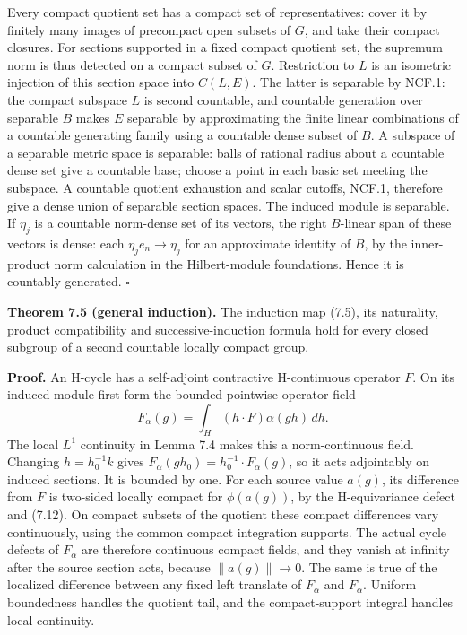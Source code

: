 \documentclass[
  11pt,
]{article}
\begin{document}
Every compact quotient set has a compact set of representatives: cover
it by finitely many images of precompact open subsets of \(G\), and take
their compact closures. For sections supported in a fixed compact
quotient set, the supremum norm is thus detected on a compact subset of
\(G\). Restriction to \(L\) is an isometric injection of this section
space into \(C(L,E)\). The latter is separable by NCF.1: the compact
subspace \(L\) is second countable, and countable generation over
separable \(B\) makes \(E\) separable by approximating the finite linear
combinations of a countable generating family using a countable dense
subset of \(B\). A subspace of a separable metric space is separable:
balls of rational radius about a countable dense set give a countable
base; choose a point in each basic set meeting the subspace. A countable
quotient exhaustion and scalar cutoffs, NCF.1, therefore give a dense
union of separable section spaces. The induced module is separable. If
\(\eta_j\) is a countable norm-dense set of its vectors, the right
\(B\)-linear span of these vectors is dense: each
\(\eta_j e_n\to\eta_j\) for an approximate identity of \(B\), by the
inner-product norm calculation in the Hilbert-module foundations. Hence
it is countably generated. \(\square\)

\textbf{Theorem 7.5 (general induction).} The induction map (7.5), its
naturality, product compatibility and successive-induction formula hold
for every closed subgroup of a second countable locally compact group.

\textbf{Proof.} An H-cycle has a self-adjoint contractive H-continuous
operator \(F\). On its induced module first form the bounded pointwise
operator field \[
F_\alpha(g)=\int_H(h\cdot F)\alpha(gh)\,dh.
\tag{7.14}
\] The local \(L^1\) continuity in Lemma 7.4 makes this a
norm-continuous field. Changing \(h=h_0^{-1}k\) gives
\(F_\alpha(gh_0)=h_0^{-1}\cdot F_\alpha(g)\), so it acts adjointably on
induced sections. It is bounded by one. For each source value \(a(g)\),
its difference from \(F\) is two-sided locally compact for
\(\phi(a(g))\), by the H-equivariance defect and (7.12). On compact
subsets of the quotient these compact differences vary continuously,
using the common compact integration supports. The actual cycle defects
of \(F_\alpha\) are therefore continuous compact fields, and they vanish
at infinity after the source section acts, because \(\|a(g)\|\to0\). The
same is true of the localized difference between any fixed left
translate of \(F_\alpha\) and \(F_\alpha\). Uniform boundedness handles
the quotient tail, and the compact-support integral handles local
continuity.
\end{document}
